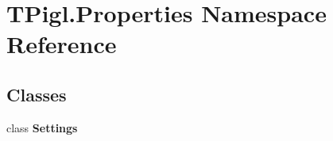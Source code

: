 \hypertarget{namespace_t_pigl_1_1_properties}{}\section{T\+Pigl.\+Properties Namespace Reference}
\label{namespace_t_pigl_1_1_properties}
\subsection*{Classes}
\begin{DoxyCompactItemize}
\item 
class {\bfseries Settings}
\end{DoxyCompactItemize}
